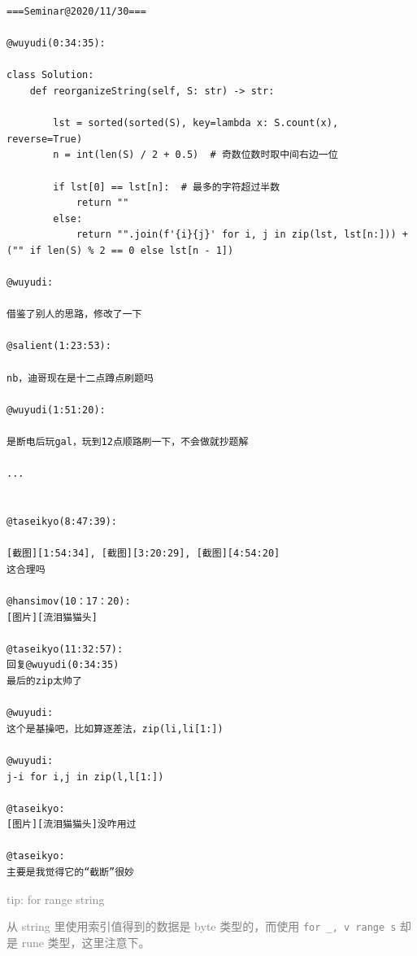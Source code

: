 \begin{lstlisting}
===Seminar@2020/11/30===

@wuyudi(0:34:35):

class Solution:
    def reorganizeString(self, S: str) -> str:

        lst = sorted(sorted(S), key=lambda x: S.count(x), reverse=True)
        n = int(len(S) / 2 + 0.5)  # 奇数位数时取中间右边一位

        if lst[0] == lst[n]:  # 最多的字符超过半数
            return ""
        else:
            return "".join(f'{i}{j}' for i, j in zip(lst, lst[n:])) + ("" if len(S) % 2 == 0 else lst[n - 1])

@wuyudi:

借鉴了别人的思路，修改了一下

@salient(1:23:53):

nb，迪哥现在是十二点蹲点刷题吗

@wuyudi(1:51:20):

是断电后玩gal，玩到12点顺路刷一下，不会做就抄题解

...


@taseikyo(8:47:39):

[截图][1:54:34], [截图][3:20:29], [截图][4:54:20]
这合理吗

@hansimov(10：17：20):
[图片][流泪猫猫头]

@taseikyo(11:32:57):
回复@wuyudi(0:34:35)
最后的zip太帅了

@wuyudi:
这个是基操吧，比如算逐差法，zip(li,li[1:])

@wuyudi:
j-i for i,j in zip(l,l[1:])

@taseikyo:
[图片][流泪猫猫头]没咋用过

@taseikyo:
主要是我觉得它的“截断”很妙
\end{lstlisting}

\begin{myquote}
\textcolor{gray}{tip: for range string}
\end{myquote}

\begin{myquote}
\textcolor{gray}{从 string 里使用索引值得到的数据是 byte 类型的，而使用 \lstinline{for _, v range s} 却是 rune 类型，这里注意下。}
\end{myquote}

